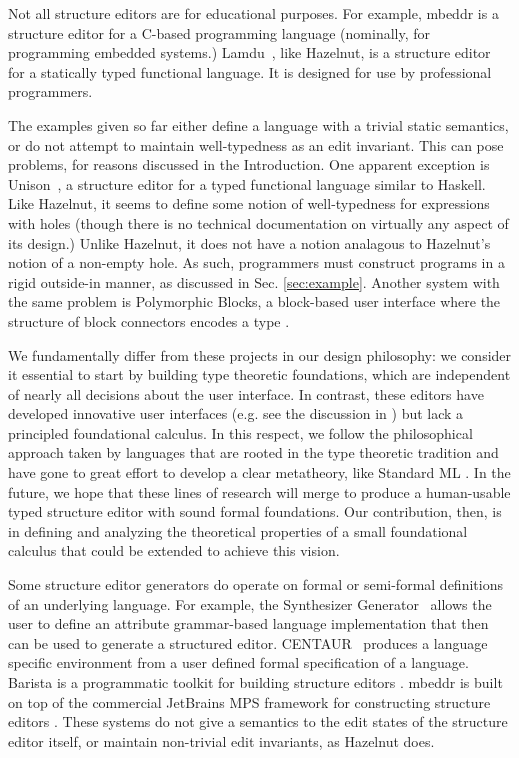 \documentclass[preprint,9pt]{sigplanconf}
\begin{document}
Not all structure editors are for educational purposes. For example,
mbeddr \cite{voelter_mbeddr:_2012} is a structure editor for a C-based programming language (nominally, for programming embedded systems.)  
Lamdu~\cite{lamdu}, like Hazelnut, is a structure editor for a statically typed functional language. It is designed for use by professional programmers. 

The examples given so far either define a language with a trivial static semantics, or do not attempt to maintain well-typedness as an edit invariant. This can pose problems, for reasons discussed in the Introduction. One apparent exception is Unison~\cite{unison}, a structure editor for a typed functional language similar to Haskell. Like Hazelnut, it seems to define some notion of well-typedness for expressions with holes (though there is no technical documentation on virtually any aspect of its design.) Unlike Hazelnut, it does not have a notion analagous to Hazelnut's notion of a non-empty hole. As such, programmers must construct programs in a rigid outside-in manner, as discussed in Sec. \ref{sec:example}. Another system with the same problem is Polymorphic Blocks, a block-based user interface where the structure of block connectors encodes a type \cite{DBLP:conf/chi/LernerFG15}.

We fundamentally differ from these projects in our design philosophy: we consider it essential to start by building type theoretic foundations, which are independent of nearly all decisions about the user interface. In contrast, these editors have developed innovative user interfaces (e.g. see the discussion in \cite{DBLP:conf/sle/VolterSBK14}) but lack a principled foundational calculus. In this respect, we follow the philosophical approach taken by languages that are rooted in the type theoretic tradition and have gone to great effort to develop a clear metatheory, like Standard ML \cite{mthm97-for-dart,Harper00atype-theoretic}.  In the future, we hope that these lines of research will merge to produce a human-usable typed structure editor with sound formal foundations. Our contribution, then, is in defining and analyzing the theoretical properties of a small foundational calculus that could be extended to achieve this vision.

Some structure editor generators do operate on formal or semi-formal definitions of an underlying language. For example, the Synthesizer Generator~\cite{Reps:1984:SG:390010.808247} allows the user to define an attribute grammar-based language implementation that then can be used to generate a structured editor. CENTAUR~\cite{Borras:1988:CS:64140.65005} produces a language specific environment from a user defined formal specification of a language. Barista is a programmatic toolkit for building structure editors \cite{ko_barista:_2006}. mbeddr is built on top of the commercial JetBrains MPS framework for constructing structure editors \cite{voelter2011language,DBLP:journals/software/VoelterWK15}. These systems do not give a semantics to the edit states of the structure editor itself, or maintain non-trivial edit invariants, as Hazelnut does. 
\end{document}

